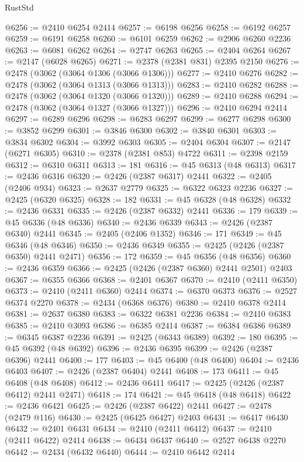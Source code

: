 \begin{lexlean}{RustStd}
\begin{coremodule}
@6256 := @2410 @6254 @2414
@6257 := @6198 @6256
@6258 := @6192 @6257
@6259 := @6191 @6258
@6260 := @6101 @6259
@6262 := @2906 @6260 @2236
@6263 := @6081 @6262
@6264 := @2747 @6263
@6265 := @2404 @6264
@6267 := @2147 (@6028 @6265)
@6271 := @2378 (@2381 @831) @2395 @2150
@6276 := @2478 (@3062 (@3064 @1306 (@3066 @1306)))
@6277 := @2410 @6276
@6282 := @2478 (@3062 (@3064 @1313 (@3066 @1313)))
@6283 := @2410 @6282
@6288 := @2478 (@3062 (@3064 @1320 (@3066 @1320)))
@6289 := @2410 @6288
@6294 := @2478 (@3062 (@3064 @1327 (@3066 @1327)))
@6296 := @2410 @6294 @2414
@6297 := @6289 @6296
@6298 := @6283 @6297
@6299 := @6277 @6298
@6300 := @3852 @6299
@6301 := @3846 @6300
@6302 := @3840 @6301
@6303 := @3834 @6302
@6304 := @3992 @6303
@6305 := @2404 @6304
@6307 := @2147 (@6271 @6305)
@6310 := @2378 (@2381 @853) @4722
@6311 := @2398 @2159
@6312 := @6310 @6311
@6313 := 181
@6316 := @45 @6313 (@48 @6313)
@6317 := @2436 @6316
@6320 := @2426 (@2387 @6317) @2441
@6322 := @2405 (@2406 @934)
@6323 := @2637 @2779
@6325 := @6322 @6323 @2236
@6327 := @2425 (@6320 @6325)
@6328 := 182
@6331 := @45 @6328 (@48 @6328)
@6332 := @2436 @6331
@6335 := @2426 (@2387 @6332) @2441
@6336 := 179
@6339 := @45 @6336 (@48 @6336)
@6340 := @2436 @6339
@6343 := @2426 (@2387 @6340) @2441
@6345 := @2405 (@2406 @1352)
@6346 := 171
@6349 := @45 @6346 (@48 @6346)
@6350 := @2436 @6349
@6355 := @2425 (@2426 (@2387 @6350) @2441 @2471)
@6356 := 172
@6359 := @45 @6356 (@48 @6356)
@6360 := @2436 @6359
@6366 := @2425 (@2426 (@2387 @6360) @2441 @2501) @2403
@6367 := @6355 @6366
@6368 := @2401 @6367
@6370 := @2410 (@2411 @6350)
@6373 := @2410 (@2411 @6360) @2414
@6374 := @6370 @6373
@6376 := @2527 @6374 @2270
@6378 := @2434 (@6368 @6376)
@6380 := @2410 @6378 @2414
@6381 := @2637 @6380
@6383 := @6322 @6381 @2236
@6384 := @2410 @6383
@6385 := @2410 @3093
@6386 := @6385 @2414
@6387 := @6384 @6386
@6389 := @6345 @6387 @2236
@6391 := @2425 (@6343 @6389)
@6392 := 180
@6395 := @45 @6392 (@48 @6392)
@6396 := @2436 @6395
@6399 := @2426 (@2387 @6396) @2441
@6400 := 177
@6403 := @45 @6400 (@48 @6400)
@6404 := @2436 @6403
@6407 := @2426 (@2387 @6404) @2441
@6408 := 173
@6411 := @45 @6408 (@48 @6408)
@6412 := @2436 @6411
@6417 := @2425 (@2426 (@2387 @6412) @2441 @2471)
@6418 := 174
@6421 := @45 @6418 (@48 @6418)
@6422 := @2436 @6421
@6425 := @2426 (@2387 @6422) @2441
@6427 := @2478 (@2479 @116)
@6430 := @2425 (@6425 @6427) @2403
@6431 := @6417 @6430
@6432 := @2401 @6431
@6434 := @2410 (@2411 @6412)
@6437 := @2410 (@2411 @6422) @2414
@6438 := @6434 @6437
@6440 := @2527 @6438 @2270
@6442 := @2434 (@6432 @6440)
@6444 := @2410 @6442 @2414

\end{coremodule}
\end{lexlean}
